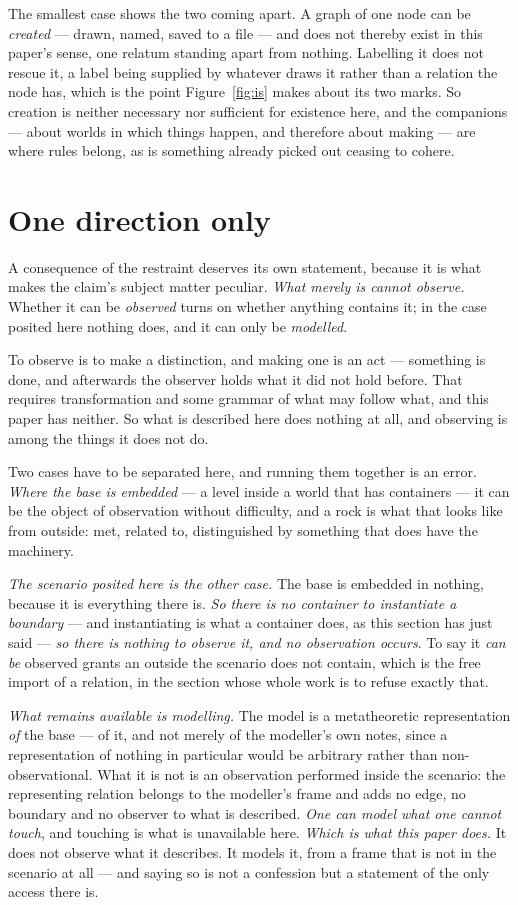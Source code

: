 \documentclass[11pt,a4paper]{article}
\begin{document}
The smallest case shows the two coming apart. A graph of one node can be \emph{created} --- drawn,
named, saved to a file --- and does not thereby exist in this paper's sense, one relatum standing apart
from nothing. Labelling it does not rescue it, a label being supplied by whatever draws it rather than a
relation the node has, which is the point Figure~\ref{fig:is} makes about its two marks. So creation is
neither necessary nor sufficient for existence here, and the companions --- about worlds in which things
happen, and therefore about making --- are where rules belong, as is something already picked out
ceasing to cohere.

\section{One direction only}\label{sec:one-way}
A consequence of the restraint deserves its own statement, because it is what makes the claim's subject
matter peculiar. \emph{What merely is cannot observe.} Whether it can be \emph{observed} turns on whether anything
contains it; in the case posited here nothing does, and it can only be \emph{modelled}.

To observe is to make a distinction, and making one is an act --- something is done, and afterwards the
observer holds what it did not hold before. That requires transformation and some grammar of what may
follow what, and this paper has neither. So what is described here does nothing at all, and observing is
among the things it does not do.

Two cases have to be separated here, and running them together is an error. \emph{Where the base is
embedded} --- a level inside a world that has containers --- it can be the object of observation without
difficulty, and a rock is what that looks like from outside: met, related to, distinguished by something
that does have the machinery.

\emph{The scenario posited here is the other case.} The base is embedded in nothing, because it is
everything there is. \emph{So there is no container to instantiate a boundary} --- and instantiating is
what a container does, as this section has just said --- \emph{so there is nothing to observe it, and no
observation occurs}. To say it \emph{can be} observed grants an outside the scenario does not contain,
which is the free import of a relation, in the section whose whole work is to refuse exactly that.

\emph{What remains available is modelling.} The model is a metatheoretic representation \emph{of} the base --- of
it, and not merely of the modeller's own notes, since a representation of nothing in particular would
be arbitrary rather than non-observational. What it is not is an observation performed inside the
scenario: the representing relation belongs to the modeller's frame and adds no edge, no boundary and
no observer to what is described. \emph{One can model what one cannot touch}, and touching is what is
unavailable here. \emph{Which is what this paper does.} It does not observe what it describes. It models
it, from a frame that is not in the scenario at all --- and saying so is not a confession but a
statement of the only access there is.
\end{document}
